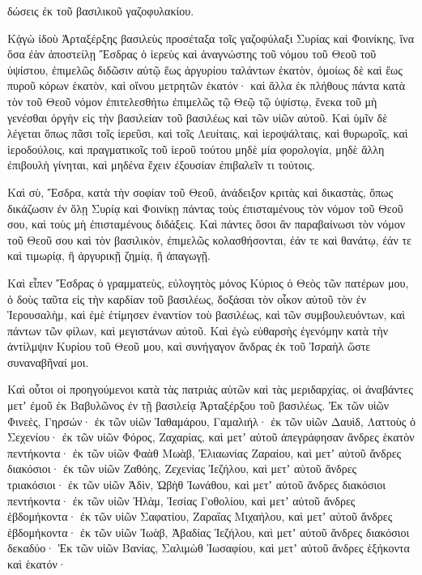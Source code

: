 {δώσεις ἐκ τοῦ βασιλικοῦ γαζοφυλακίου.
\par }{\PP {}Κᾀγὼ ἰδοὺ Ἀρταξέρξης βασιλεὺς προσέταξα τοῖς γαζοφύλαξι Συρίας καὶ Φοινίκης, ἵνα ὅσα ἐὰν ἀποστείλῃ Ἔσδρας ὁ ἱερεὺς καὶ ἀναγνώστης τοῦ νόμου τοῦ Θεοῦ τοῦ ὑψίστου, ἐπιμελῶς διδῶσιν αὐτῷ ἕως ἀργυρίου ταλάντων ἑκατὸν,
ὁμοίως δὲ καὶ ἕως πυροῦ κόρων ἑκατὸν, καὶ οἴνου μετρητῶν ἑκατόν·
καὶ ἄλλα ἐκ πλήθους πάντα κατὰ τὸν τοῦ Θεοῦ νόμον ἐπιτελεσθήτω ἐπιμελῶς τῷ Θεῷ τῷ ὑψίστῳ, ἕνεκα τοῦ μὴ γενέσθαι ὀργὴν εἰς τὴν βασιλείαν τοῦ βασιλέως καὶ τῶν υἱῶν αὐτοῦ.
Καὶ ὑμῖν δὲ λέγεται ὅπως πᾶσι τοῖς ἱερεῦσι, καὶ τοῖς Λευίταις, καὶ ἱεροψάλταις, καὶ θυρωροῖς, καὶ ἱεροδούλοις, καὶ πραγματικοῖς τοῦ ἱεροῦ τούτου μηδὲ μία φορολογία, μηδὲ ἄλλη ἐπιβουλὴ γίνηται, καὶ μηδένα ἔχειν ἐξουσίαν ἐπιβαλεῖν τι τούτοις.
\par }{\PP {}Καὶ σὺ, Ἔσδρα, κατὰ τὴν σοφίαν τοῦ Θεοῦ, ἀνάδειξον κριτὰς καὶ δικαστὰς, ὅπως δικάζωσιν ἐν ὅλῃ Συρίᾳ καὶ Φοινίκῃ πάντας τοὺς ἐπισταμένους τὸν νόμον τοῦ Θεοῦ σου, καὶ τοὺς μὴ ἐπισταμένους διδάξεις.
Καὶ πάντες ὅσοι ἂν παραβαίνωσι τὸν νόμον τοῦ Θεοῦ σου καὶ τὸν βασιλικὸν, ἐπιμελῶς κολασθήσονται, ἐάν τε καὶ θανάτῳ, ἐάν τε καὶ τιμωρίᾳ, ἢ ἀργυρικῇ ζημίᾳ, ἢ ἀπαγωγῇ.
\par }{\PP {}Καὶ εἶπεν Ἔσδρας ὁ γραμματεὺς, εὐλογητὸς μόνος Κύριος ὁ Θεὸς τῶν πατέρων μου, ὁ δοὺς ταῦτα εἰς τὴν καρδίαν τοῦ βασιλέως, δοξάσαι τὸν οἶκον αὐτοῦ τὸν ἐν Ἱερουσαλὴμ,
καὶ ἐμὲ ἐτίμησεν ἐναντίον τοὺ βασιλέως, καὶ τῶν συμβουλευόντων, καὶ πάντων τῶν φίλων, καὶ μεγιστάνων αὐτοῦ.
Καὶ ἐγὼ εὐθαρσὴς ἐγενόμην κατὰ τὴν ἀντίλμψιν Κυρίου τοῦ Θεοῦ μου, καὶ συνήγαγον ἄνδρας ἐκ τοῦ Ἰσραὴλ ὥστε συναναβῆναί μοι.
\par }{\PP {}Καὶ οὗτοι οἱ προηγούμενοι κατὰ τὰς πατριὰς αὐτῶν καὶ τὰς μεριδαρχίας, οἱ ἀναβάντες μετʼ ἐμοῦ ἐκ Βαβυλῶνος ἐν τῇ βασιλείᾳ Ἀρταξέρξου τοῦ βασιλέως.
Ἐκ τῶν υἱῶν Φινεὲς, Γηρσών· ἐκ τῶν υἱῶν Ἰαθαμάρου, Γαμαλιήλ· ἐκ τῶν υἱῶν Δαυὶδ, Λαττοὺς ὁ Σεχενίου·
ἐκ τῶν υἱῶν Φόρος, Ζαχαρίας, καὶ μετʼ αὐτοῦ ἀπεγράφησαν ἄνδρες ἑκατὸν πεντήκοντα·
ἐκ τῶν υἱῶν Φαὰθ Μωὰβ, Ἐλιαωνίας Ζαραίου, καὶ μετʼ αὐτοῦ ἄνδρες διακόσιοι·
ἐκ τῶν υἱῶν Ζαθόης, Ζεχενίας Ἰεζήλου, καὶ μετʼ αὐτοῦ ἄνδρες τριακόσιοι· ἐκ τῶν υἱῶν Ἀδὶν, Ὠβὴθ Ἰωνάθου, καὶ μετʼ αὐτοῦ ἄνδρες διακόσιοι πεντήκοντα·
ἐκ τῶν υἱῶν Ἠλὰμ, Ἰεσίας Γοθολίου, καὶ μετʼ αὐτοῦ ἄνδρες ἑβδομήκοντα·
ἐκ τῶν υἱῶν Σαφατίου, Ζαραΐας Μιχαήλου, καὶ μετʼ αὐτοῦ ἄνδρες ἑβδομήκοντα·
ἐκ τῶν υἱῶν Ἰωὰβ, Ἀβαδίας Ἰεζήλου, καὶ μετʼ αὐτοῦ ἄνδρες διακόσιοι δεκαδύο·
Ἐκ τῶν υἱῶν Βανίας, Σαλιμὼθ Ἰωσαφίου, καὶ μετʼ αὐτοῦ ἄνδρες ἑξήκοντα καὶ ἑκατόν·
}
